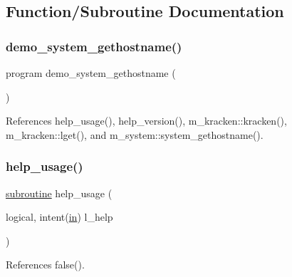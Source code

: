 \subsection{Function/\+Subroutine Documentation}
\mbox{\label{__hostname_8f90_a8cf8b2c2d1597761d376d337686d3667}} 
\subsubsection{\texorpdfstring{demo\+\_\+system\+\_\+gethostname()}{demo\_system\_gethostname()}}
{\footnotesize\ttfamily program demo\+\_\+system\+\_\+gethostname (\begin{DoxyParamCaption}{ }\end{DoxyParamCaption})}



References help\+\_\+usage(), help\+\_\+version(), m\+\_\+kracken\+::kracken(), m\+\_\+kracken\+::lget(), and m\+\_\+system\+::system\+\_\+gethostname().

\mbox{\label{__hostname_8f90_a3e09a3b52ee8fb04eeb93fe5761626a8}} 
\subsubsection{\texorpdfstring{help\+\_\+usage()}{help\_usage()}}
{\footnotesize\ttfamily \hyperlink{M__stopwatch_83_8txt_acfbcff50169d691ff02d4a123ed70482}{subroutine} help\+\_\+usage (\begin{DoxyParamCaption}\item[{logical, intent(\hyperlink{M__journal_83_8txt_afce72651d1eed785a2132bee863b2f38}{in})}]{l\+\_\+help }\end{DoxyParamCaption})}



References false().

\mbox{\label{__hostname_8f90_a39c21619b08a3c22f19e2306efd7f766}} 
